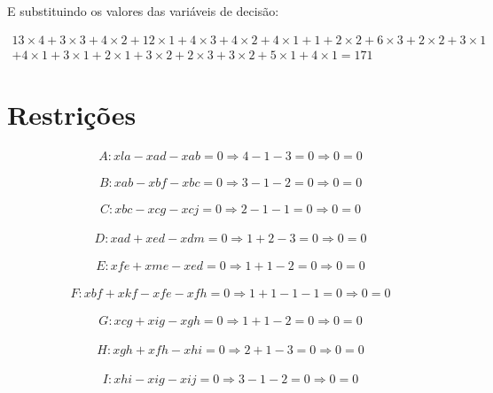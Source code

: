 \documentclass[a4paper]{report}
\begin{document}
E substituindo os valores das variáveis de decisão:


\begin{multline}
13\times 4 + 3\times 3 + 4\times 2 + 12\times 1 + 4\times
3 + 4\times 2 + 4\times 1 + 1 + 2\times 2 + 6\times 3 +
2\times 2 + 3\times 1 \\ + 4\times 1 + 3\times 1 + 2\times 1 +
3\times 2 + 2\times 3 + 3\times 2 + 5\times 1 + 4\times 1 
= 171
\end{multline}

\section{Restrições}
\begin{multline}
A: xla - xad - xab = 0
\Rightarrow 4 - 1 - 3 = 0 
\Rightarrow 0 = 0
\end{multline}

\begin{multline}
B: xab - xbf - xbc = 0 
\Rightarrow 3 - 1 - 2 = 0
\Rightarrow 0 = 0
\end{multline}

\begin{multline}
C: xbc - xcg - xcj = 0
\Rightarrow 2 - 1 - 1 = 0
\Rightarrow 0 = 0
\end{multline}

\begin{multline}
D: xad + xed - xdm = 0
\Rightarrow 1 + 2 - 3 = 0
\Rightarrow 0 = 0
\end{multline}

\begin{multline}
E: xfe + xme - xed = 0
\Rightarrow 1 + 1 - 2 = 0
\Rightarrow 0 = 0
\end{multline}

\begin{multline}
F: xbf + xkf - xfe - xfh = 0
\Rightarrow 1 + 1 - 1 - 1 = 0
\Rightarrow 0 = 0
\end{multline}

\begin{multline}
G: xcg + xig - xgh = 0
\Rightarrow 1 + 1 - 2 = 0
\Rightarrow 0 = 0
\end{multline}

\begin{multline}
H: xgh + xfh - xhi = 0
\Rightarrow 2 + 1 - 3 = 0
\Rightarrow 0 = 0
\end{multline}

\begin{multline}
I: xhi - xig - xij = 0
\Rightarrow 3 - 1 - 2 = 0
\Rightarrow 0 = 0
\end{multline}
\end{document}
